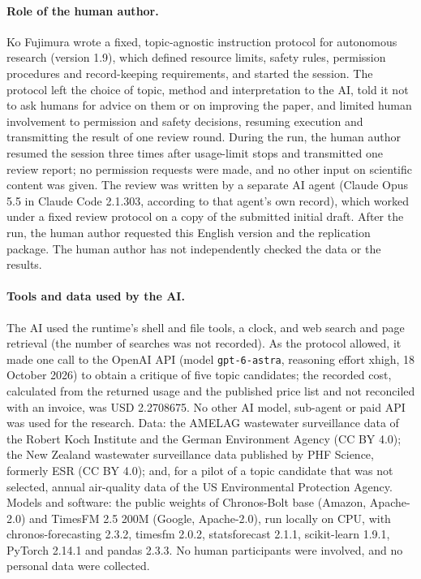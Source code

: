 \documentclass[11pt]{article}
\begin{document}
\paragraph{Role of the human author.} Ko Fujimura wrote a fixed, topic-agnostic instruction protocol for autonomous research (version 1.9), which defined resource limits, safety rules, permission procedures and record-keeping requirements, and started the session. The protocol left the choice of topic, method and interpretation to the AI, told it not to ask humans for advice on them or on improving the paper, and limited human involvement to permission and safety decisions, resuming execution and transmitting the result of one review round. During the run, the human author resumed the session three times after usage-limit stops and transmitted one review report; no permission requests were made, and no other input on scientific content was given. The review was written by a separate AI agent (Claude Opus 5.5 in Claude Code 2.1.303, according to that agent's own record), which worked under a fixed review protocol on a copy of the submitted initial draft. After the run, the human author requested this English version and the replication package. The human author has not independently checked the data or the results.

\paragraph{Tools and data used by the AI.} The AI used the runtime's shell and file tools, a clock, and web search and page retrieval (the number of searches was not recorded). As the protocol allowed, it made one call to the OpenAI API (model \texttt{gpt-6-astra}, reasoning effort xhigh, 18 October 2026) to obtain a critique of five topic candidates; the recorded cost, calculated from the returned usage and the published price list and not reconciled with an invoice, was USD 2.2708675. No other AI model, sub-agent or paid API was used for the research. Data: the AMELAG wastewater surveillance data of the Robert Koch Institute and the German Environment Agency (CC BY 4.0); the New Zealand wastewater surveillance data published by PHF Science, formerly ESR (CC BY 4.0); and, for a pilot of a topic candidate that was not selected, annual air-quality data of the US Environmental Protection Agency. Models and software: the public weights of Chronos-Bolt base (Amazon, Apache-2.0) and TimesFM 2.5 200M (Google, Apache-2.0), run locally on CPU, with chronos-forecasting 2.3.2, timesfm 2.0.2, statsforecast 2.1.1, scikit-learn 1.9.1, PyTorch 2.14.1 and pandas 2.3.3. No human participants were involved, and no personal data were collected.
\end{document}
